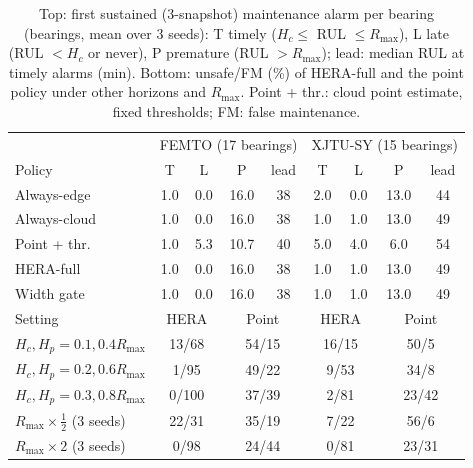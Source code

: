 \begin{table}[t]
\centering
\caption{Top: first sustained (3-snapshot) maintenance alarm per bearing (bearings, mean over 3 seeds): T timely ($H_c\le$ RUL $\le R_{\max}$), L late (RUL $<H_c$ or never), P premature (RUL $>R_{\max}$); lead: median RUL at timely alarms (min). Bottom: unsafe/FM (\%) of HERA-full and the point policy under other horizons and $R_{\max}$. Point + thr.: cloud point estimate, fixed thresholds; FM: false maintenance.}
\label{tab:timing}
\setlength{\tabcolsep}{2.6pt}\footnotesize
\begin{tabular}{l|cccc|cccc}
\toprule
 & \multicolumn{4}{c|}{FEMTO (17 bearings)} & \multicolumn{4}{c}{XJTU-SY (15 bearings)} \\
Policy & T & L & P & lead & T & L & P & lead \\
\midrule
Always-edge & 1.0 & 0.0 & 16.0 & 38 & 2.0 & 0.0 & 13.0 & 44 \\
Always-cloud & 1.0 & 0.0 & 16.0 & 38 & 1.0 & 1.0 & 13.0 & 49 \\
Point + thr. & 1.0 & 5.3 & 10.7 & 40 & 5.0 & 4.0 & 6.0 & 54 \\
HERA-full & 1.0 & 0.0 & 16.0 & 38 & 1.0 & 1.0 & 13.0 & 49 \\
Width gate & 1.0 & 0.0 & 16.0 & 38 & 1.0 & 1.0 & 13.0 & 49 \\
\midrule
Setting & \multicolumn{2}{c}{HERA} & \multicolumn{2}{c|}{Point} & \multicolumn{2}{c}{HERA} & \multicolumn{2}{c}{Point} \\
\midrule
$H_c,H_p{=}0.1,0.4R_{\max}$ & \multicolumn{2}{c}{13/68} & \multicolumn{2}{c|}{54/15} & \multicolumn{2}{c}{16/15} & \multicolumn{2}{c}{50/5} \\
$H_c,H_p{=}0.2,0.6R_{\max}$ & \multicolumn{2}{c}{1/95} & \multicolumn{2}{c|}{49/22} & \multicolumn{2}{c}{9/53} & \multicolumn{2}{c}{34/8} \\
$H_c,H_p{=}0.3,0.8R_{\max}$ & \multicolumn{2}{c}{0/100} & \multicolumn{2}{c|}{37/39} & \multicolumn{2}{c}{2/81} & \multicolumn{2}{c}{23/42} \\
$R_{\max}\times\frac12$ (3 seeds) & \multicolumn{2}{c}{22/31} & \multicolumn{2}{c|}{35/19} & \multicolumn{2}{c}{7/22} & \multicolumn{2}{c}{56/6} \\
$R_{\max}\times 2$ (3 seeds) & \multicolumn{2}{c}{0/98} & \multicolumn{2}{c|}{24/44} & \multicolumn{2}{c}{0/81} & \multicolumn{2}{c}{23/31} \\
\bottomrule
\end{tabular}
\end{table}
